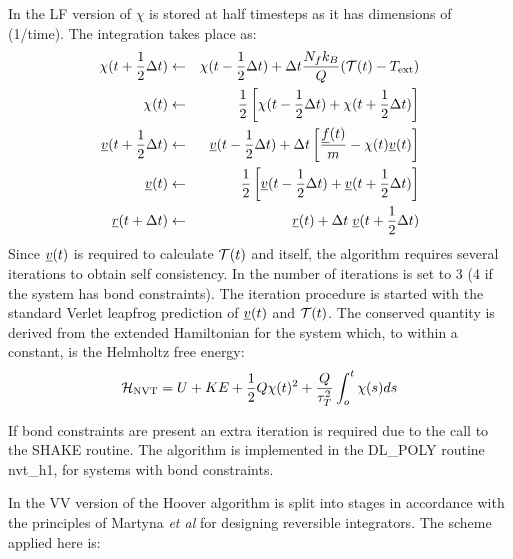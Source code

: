 In the LF version of \D{}  $\chi$ is stored at half timesteps
as it has dimensions of (1/time). The integration takes place as:
\begin{eqnarray}
\chi(t+{1\over2}\Delta t) &\leftarrow& \chi(t-{1\over 2}\Delta t) + 
\Delta t {N_fk_B \over Q}
({\cal T}(t) - T_{\rm ext}) \nonumber\\
\chi(t) &\leftarrow& {1\over 2} \left[\chi(t-{1\over 2}\Delta t)+\chi(t+{1\over 2}\Delta t)\right]\nonumber\\
\mbox{$\underline{v}$}(t + {1\over 2} \Delta t)&\leftarrow& \mbox{$\underline{v}$}(t-{1\over 2} \Delta t) +
 \Delta t\left[ {\mbox{$\underline{f}$}(t)\over m} -
\chi(t)\mbox{$\underline{v}$}(t)\right]\nonumber\\
\mbox{$\underline{v}$}(t)& \leftarrow& {1\over 2} \left[\mbox{$\underline{v}$}(t-{1\over 2}\Delta t)
    +\mbox{$\underline{v}$}(t+{1\over 2}\Delta t)\right]\nonumber\\
\mbox{$\underline{r}$}(t+\Delta t) &\leftarrow& \mbox{$\underline{r}$}(t) + \Delta t \; \mbox{$\underline{v}$}(t+{1\over 2}\Delta t)
\end{eqnarray}
Since $\mbox{$\underline{v}$}(t)$ is required to calculate ${\cal T}(t)$ and itself, the
algorithm requires several iterations to obtain self consistency.  In
\D{} the number of iterations is set to 3 (4 if the system has bond
constraints).  The iteration procedure is started with the standard
Verlet leapfrog prediction of $\mbox{$\underline{v}$}(t)$ and
${\cal T}(t)$. The conserved quantity is derived from the extended
Hamiltonian for the system which, to within a constant, is the
Helmholtz free energy:
\begin{equation}
{\cal H}_{\rm NVT} = U + KE + {1 \over 2}Q\chi(t)^2+
{Q \over \tau_T^2} \int_o^t \chi(s) ds
\end{equation}

If bond constraints are present an extra iteration is required due to
the call to the SHAKE routine. The algorithm is implemented in the
DL\_POLY routine {\sc nvt\_h1}, for systems with bond constraints.

In the VV version of \D{} the Hoover algorithm is split into stages in
accordance with the principles of Martyna {\em et al} \cite{martyna-96a}
for designing reversible integrators. 
The scheme applied here is:

